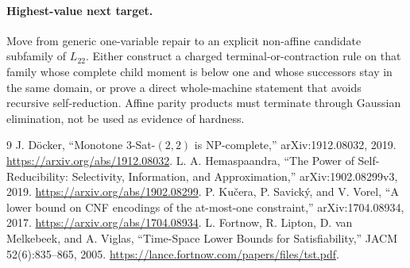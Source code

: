 \documentclass[11pt]{article}
\newcommand{\Ltwo}{L_{22}}
\begin{document}
\paragraph{Highest-value next target.}
Move from generic one-variable repair to an explicit non-affine candidate
subfamily of $\Ltwo$.  Either construct a charged terminal-or-contraction
rule on that family whose complete child moment is below one and whose
successors stay in the same domain, or prove a direct whole-machine statement
that avoids recursive self-reduction.  Affine parity products must terminate
through Gaussian elimination, not be used as evidence of hardness.

\begin{thebibliography}{9}
 J. D\"ocker, ``Monotone 3-Sat-$(2,2)$ is NP-complete,''
arXiv:1912.08032, 2019. \url{https://arxiv.org/abs/1912.08032}.
 L. A. Hemaspaandra, ``The Power of Self-Reducibility:
Selectivity, Information, and Approximation,'' arXiv:1902.08299v3, 2019.
\url{https://arxiv.org/abs/1902.08299}.
 P. Ku\v{c}era, P. Savick\'y, and V. Vorel,
``A lower bound on CNF encodings of the at-most-one constraint,''
arXiv:1704.08934, 2017. \url{https://arxiv.org/abs/1704.08934}.
 L. Fortnow, R. Lipton, D. van Melkebeek, and A. Viglas,
``Time-Space Lower Bounds for Satisfiability,'' JACM 52(6):835--865, 2005.
\url{https://lance.fortnow.com/papers/files/tst.pdf}.
\end{thebibliography}

\end{document}
